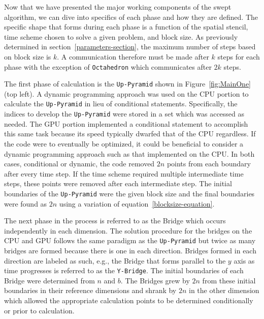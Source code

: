 \documentclass[preprints,article,accept,moreauthors,pdftex]{Definitions/mdpi}
\def\Up{\texttt{Up-Pyramid}}
\def\Oct{\texttt{Octahedron}}
\def\Yb{\texttt{Y-Bridge}}
\begin{document}
Now that we have presented the major working components of the swept algorithm, we can dive into specifics of each phase and how they are defined. The specific shape that forms during each phase is a function of the spatial stencil, time scheme chosen to solve a given problem, and block size. As previously determined in section~\ref{parameters-section}, the maximum number of steps based on block size is $k$. A communication therefore must be made after $k$ steps for each phase with the exception of \Oct{} which communicates after $2k$ steps.
 
The first phase of calculation is the \Up{} shown in Figure~\ref{fig:MainOne} (top left). A dynamic programming approach was used on the CPU portion to calculate the \Up{} in lieu of conditional statements. Specifically, the indices to develop the \Up{} were stored in a set which was accessed as needed. The GPU portion implemented a conditional statement to accomplish this same task because its speed typically dwarfed that of the CPU regardless. If the code were to eventually be optimized, it could be beneficial to consider a dynamic programming approach such as that implemented on the CPU. In both cases, conditional or dynamic, the code removed $2n$ points from each boundary after every time step. If the time scheme required multiple intermediate time steps, these points were removed after each intermediate step. The initial boundaries of the \Up{} were the given block size and the final boundaries were found as $2n$ using a variation of equation~\ref{blocksize-equation}.

The next phase in the process is referred to as the Bridge which occurs independently in each dimension. The solution procedure for the bridges on the CPU and GPU follows the same paradigm as the \Up{} but twice as many bridges are formed because there is one in each direction. Bridges formed in each direction are labeled as such, e.g., the Bridge that forms parallel to the $y$ axis as time progresses is referred to as the \Yb{}. The initial boundaries of each Bridge were determined from $n$ and $b$. The Bridges grew by $2n$ from these initial boundaries in their reference dimensions and shrank by $2n$ in the other dimension which allowed the appropriate calculation points to be determined conditionally or prior to calculation.
\end{document}
